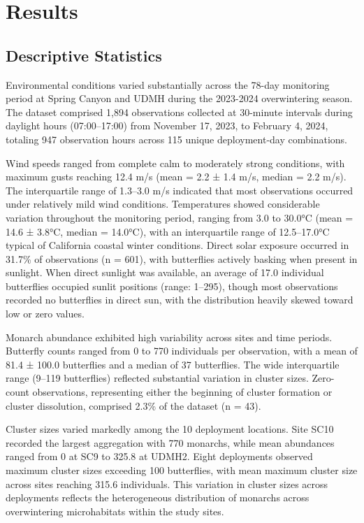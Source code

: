 \section{Results}

\subsection{Descriptive Statistics}

Environmental conditions varied substantially across the 78-day monitoring period at Spring Canyon and UDMH during the 2023-2024 overwintering season. The dataset comprised 1,894 observations collected at 30-minute intervals during daylight hours (07:00--17:00) from November 17, 2023, to February 4, 2024, totaling 947 observation hours across 115 unique deployment-day combinations.

Wind speeds ranged from complete calm to moderately strong conditions, with maximum gusts reaching 12.4 m/s (mean = 2.2 ± 1.4 m/s, median = 2.2 m/s). The interquartile range of 1.3--3.0 m/s indicated that most observations occurred under relatively mild wind conditions. Temperatures showed considerable variation throughout the monitoring period, ranging from 3.0 to 30.0°C (mean = 14.6 ± 3.8°C, median = 14.0°C), with an interquartile range of 12.5--17.0°C typical of California coastal winter conditions. Direct solar exposure occurred in 31.7\% of observations (n = 601), with butterflies actively basking when present in sunlight. When direct sunlight was available, an average of 17.0 individual butterflies occupied sunlit positions (range: 1--295), though most observations recorded no butterflies in direct sun, with the distribution heavily skewed toward low or zero values.

Monarch abundance exhibited high variability across sites and time periods. Butterfly counts ranged from 0 to 770 individuals per observation, with a mean of 81.4 ± 100.0 butterflies and a median of 37 butterflies. The wide interquartile range (9--119 butterflies) reflected substantial variation in cluster sizes. Zero-count observations, representing either the beginning of cluster formation or cluster dissolution, comprised 2.3\% of the dataset (n = 43).

Cluster sizes varied markedly among the 10 deployment locations. Site SC10 recorded the largest aggregation with 770 monarchs, while mean abundances ranged from 0 at SC9 to 325.8 at UDMH2. Eight deployments observed maximum cluster sizes exceeding 100 butterflies, with mean maximum cluster size across sites reaching 315.6 individuals. This variation in cluster sizes across deployments reflects the heterogeneous distribution of monarchs across overwintering microhabitats within the study sites.

